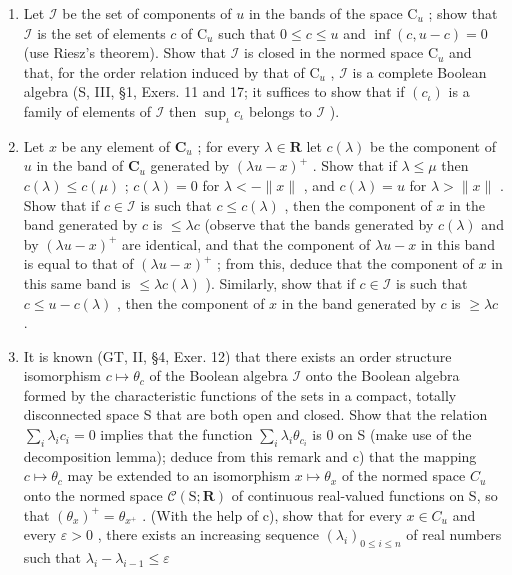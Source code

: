 \begin{enumerate}
\def\labelenumi{\alph{enumi})}
\setcounter{enumi}{1}
\item
  Let \(\mathcal{I}\) be the set of components of \(u\) in the bands of the space \(\mathrm{C}_u\) ; show that \(\mathcal{I}\) is the set of elements \(c\) of \(\mathrm{C}_u\) such that \(0 \leqslant c \leqslant u\) and \(\inf(c, u - c) = 0\) (use Riesz's theorem). Show that \(\mathcal{I}\) is closed in the normed space \(\mathrm{C}_u\) and that, for the order relation induced by that of \(\mathrm{C}_u\) , \(\mathcal{I}\) is a complete Boolean algebra (S, III, §1, Exers. 11 and 17; it suffices to show that if \((c_\iota)\) is a family of elements of \(\mathcal{I}\) then \(\sup_{\iota} c_\iota\) belongs to \(\mathcal{I}\) ).
\item
  Let \(x\) be any element of \(\mathbf{C}_u\) ; for every \(\lambda \in \mathbf{R}\) let \(c(\lambda)\) be the component of \(u\) in the band of \(\mathbf{C}_u\) generated by \((\lambda u - x)^+\) . Show that if \(\lambda \leqslant \mu\) then \(c(\lambda) \leqslant c(\mu)\) ; \(c(\lambda) = 0\) for \(\lambda < -\|x\|\) , and \(c(\lambda) = u\) for \(\lambda > \|x\|\) . Show that if \(c \in \mathcal{I}\) is such that \(c \leqslant c(\lambda)\) , then the component of \(x\) in the band generated by \(c\) is \(\leqslant \lambda c\) (observe that the bands generated by \(c(\lambda)\) and by \((\lambda u - x)^+\) are identical, and that the component of \(\lambda u - x\) in this band is equal to that of \((\lambda u - x)^+\) ; from this, deduce that the component of \(x\) in this same band is \(\leqslant \lambda c(\lambda)\) ). Similarly, show that if \(c \in \mathcal{I}\) is such that \(c \leqslant u - c(\lambda)\) , then the component of \(x\) in the band generated by \(c\) is \(\geqslant \lambda c\) .
\item
  It is known (GT, II, §4, Exer. 12) that there exists an order structure isomorphism \(c \mapsto \theta_c\) of the Boolean algebra \(\mathcal{I}\) onto the Boolean algebra formed by the characteristic functions of the sets in a compact, totally disconnected space S that are both open and closed. Show that the relation \(\sum_{i} \lambda_i c_i = 0\) implies that the function \(\sum_{i} \lambda_i \theta_{c_i}\) is 0 on S (make use of the decomposition lemma); deduce from this remark and c) that the mapping \(c \mapsto \theta_{c}\) may be extended to an isomorphism \(x \mapsto \theta_{x}\) of the normed space \(C_{u}\) onto the normed space \(\mathcal{C}(\mathrm{S};\mathbf{R})\) of continuous real-valued functions on S, so that \((\theta_{x})^{+} = \theta_{x^{+}}\) . (With the help of c), show that for every \(x \in C_{u}\) and every \(\varepsilon > 0\) , there exists an increasing sequence \((\lambda_{i})_{0 \leqslant i \leqslant n}\) of real numbers such that \(\lambda_{i} - \lambda_{i-1} \leqslant \varepsilon\)
\end{enumerate}

